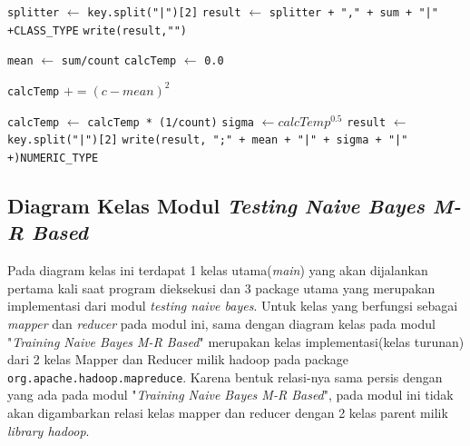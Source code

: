 \begin{enumerate}
\begin{algorithm}[H]
\begin{algorithmic}[1]
\State \texttt{splitter} $\gets$ \texttt{key.split("|")[2]}
\State \texttt{result} $\gets$ \texttt{splitter + "," + sum + "|" +}\verb|CLASS_TYPE|
\State \texttt{write(result,"")}


\State \texttt{mean} $\gets$ \texttt{sum/count}
\State \texttt{calcTemp} $\gets$ \texttt{0.0}

	\State \texttt{calcTemp} $+= (c - mean)^2$
\EndFor

\State \texttt{calcTemp} $\gets$ \texttt{calcTemp * (1/count)}
\State \texttt{sigma} $\gets calcTemp^{0.5}$
\State \texttt{result} $\gets$  \texttt{key.split("|")[2]}
\State \texttt{write(result, ";" + mean + "|" + sigma + "|" +)}\verb|NUMERIC_TYPE|

\EndIf

\EndProcedure
\end{algorithmic}
\end{algorithm}
	
\end{enumerate}

\subsection{Diagram Kelas Modul \textit{Testing Naive Bayes M-R Based}}
Pada diagram kelas ini terdapat 1 kelas utama(\textit{main}) yang akan dijalankan pertama kali saat program dieksekusi dan 3 package utama yang merupakan implementasi dari modul \textit{testing naive bayes}. Untuk kelas yang berfungsi sebagai \textit{mapper} dan \textit{reducer} pada modul ini, sama dengan diagram kelas pada modul "\textit{Training Naive Bayes M-R Based}" merupakan kelas implementasi(kelas turunan) dari 2 kelas Mapper dan Reducer milik hadoop pada package \verb|org.apache.hadoop.mapreduce|. Karena bentuk relasi-nya sama persis dengan yang ada pada modul "\textit{Training Naive Bayes M-R Based}", pada modul ini tidak akan digambarkan relasi kelas mapper dan reducer dengan 2 kelas parent milik \textit{library hadoop}.


